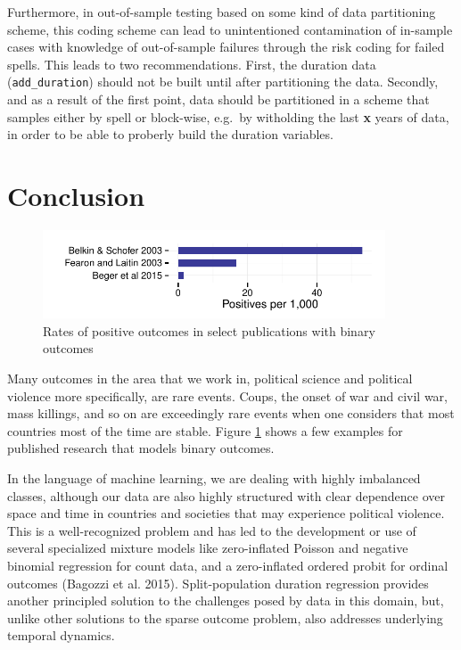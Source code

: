 \documentclass[article]{jss}
\begin{document}
Furthermore, in out-of-sample testing based on some kind of data
partitioning scheme, this coding scheme can lead to unintentioned
contamination of in-sample cases with knowledge of out-of-sample
failures through the risk coding for failed spells. This leads to two
recommendations. First, the duration data (\texttt{add\_duration})
should not be built until after partitioning the data. Secondly, and as
a result of the first point, data should be partitioned in a scheme that
samples either by spell or block-wise, e.g.~by witholding the last
\textbf{x} years of data, in order to be able to proberly build the
duration variables.

\section{Conclusion}\label{conclusion}

\begin{figure}[htbp!]
\centering
\includegraphics[width = 4in]{graphics/rates.pdf}
\caption{Rates of positive outcomes in select publications with binary outcomes}
\label{rates}
\end{figure}

Many outcomes in the area that we work in, political science and
political violence more specifically, are rare events. Coups, the onset
of war and civil war, mass killings, and so on are exceedingly rare
events when one considers that most countries most of the time are
stable. Figure \ref{rates} shows a few examples for published research
that models binary outcomes.

In the language of machine learning, we are dealing with highly
imbalanced classes, although our data are also highly structured with
clear dependence over space and time in countries and societies that may
experience political violence. This is a well-recognized problem and has
led to the development or use of several specialized mixture models like
zero-inflated Poisson and negative binomial regression for count data,
and a zero-inflated ordered probit for ordinal outcomes (Bagozzi et al.
2015). Split-population duration regression provides another principled
solution to the challenges posed by data in this domain, but, unlike
other solutions to the sparse outcome problem, also addresses underlying
temporal dynamics.
\end{document}
